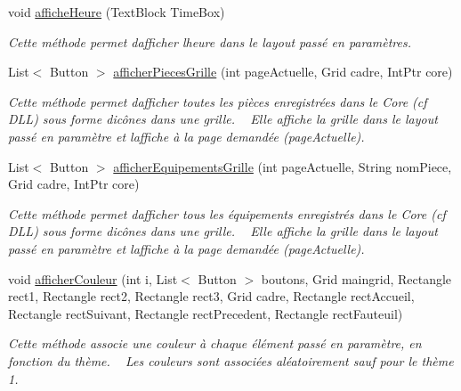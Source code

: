 \begin{DoxyCompactItemize}
void \hyperlink{class_my_domotik_1_1_affichage_a1b41c3092451423dce76c336c1036b11}{affiche\+Heure} (Text\+Block Time\+Box)
\begin{DoxyCompactList}\small\item\em Cette méthode permet d\textquotesingle{}afficher l\textquotesingle{}heure dans le layout passé en paramètres. \end{DoxyCompactList}\item 
List$<$ Button $>$ \hyperlink{class_my_domotik_1_1_affichage_a3c73ff2b9b5837148829425f0da0297a}{afficher\+Pieces\+Grille} (int page\+Actuelle, Grid cadre, Int\+Ptr core)
\begin{DoxyCompactList}\small\item\em Cette méthode permet d\textquotesingle{}afficher toutes les pièces enregistrées dans le Core (cf D\+LL) sous forme d\textquotesingle{}icônes dans une grille. ~\newline
Elle affiche la grille dans le layout passé en paramètre et l\textquotesingle{}affiche à la page demandée (page\+Actuelle). \end{DoxyCompactList}\item 
List$<$ Button $>$ \hyperlink{class_my_domotik_1_1_affichage_af33a1fbcfc31912bbdb419214d41f04e}{afficher\+Equipements\+Grille} (int page\+Actuelle, String nom\+Piece, Grid cadre, Int\+Ptr core)
\begin{DoxyCompactList}\small\item\em Cette méthode permet d\textquotesingle{}afficher tous les équipements enregistrés dans le Core (cf D\+LL) sous forme d\textquotesingle{}icônes dans une grille. ~\newline
Elle affiche la grille dans le layout passé en paramètre et l\textquotesingle{}affiche à la page demandée (page\+Actuelle). \end{DoxyCompactList}\item 
void \hyperlink{class_my_domotik_1_1_affichage_a80ececacfa28945d11e443bd699c86b1}{afficher\+Couleur} (int i, List$<$ Button $>$ boutons, Grid maingrid, Rectangle rect1, Rectangle rect2, Rectangle rect3, Grid cadre, Rectangle rect\+Accueil, Rectangle rect\+Suivant, Rectangle rect\+Precedent, Rectangle rect\+Fauteuil)
\begin{DoxyCompactList}\small\item\em Cette méthode associe une couleur à chaque élément passé en paramètre, en fonction du thème. ~\newline
Les couleurs sont associées aléatoirement sauf pour le thème 1. \end{DoxyCompactList}\end{DoxyCompactItemize}
